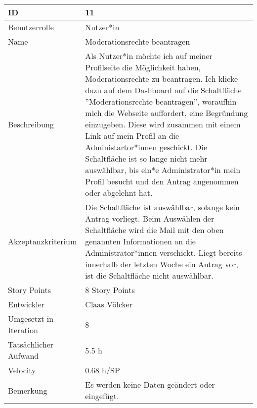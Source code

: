 \begin{tabularx}{\textwidth}{|p{}|X|}
	\hline
	ID & 11\\
	\hline
	Benutzerrolle & Nutzer*in\\
	\hline
	Name & Moderationsrechte beantragen\\
	\hline
	Beschreibung & Als Nutzer*in möchte ich auf meiner Profilseite die Möglichkeit haben, Moderationsrechte zu beantragen. Ich klicke dazu auf dem Dashboard auf die Schaltfläche ''Moderationsrechte beantragen'', woraufhin mich die Webseite auffordert, eine Begründung einzugeben. Diese wird zusammen mit einem Link auf mein Profil an die Administartor*innen geschickt. Die Schaltfläche ist so lange nicht mehr auswählbar, bis ein*e Administrator*in mein Profil besucht und den Antrag angenommen oder abgelehnt hat.\\
	\hline
	Akzeptanzkriterium & Die Schaltfläche ist auswählbar, solange kein Antrag vorliegt. Beim Auswählen der Schaltfläche wird die Mail mit den oben genannten Informationen an die Administrator*innen verschickt. Liegt bereits innerhalb der letzten Woche ein Antrag vor, ist die Schaltfläche nicht auswählbar.\\
	\hline
	Story Points & 8 Story Points\\
	\hline
	Entwickler & Claas Völcker\\
	\hline
	Umgesetzt in Iteration & 8\\
	\hline
	Tatsächlicher Aufwand & 5.5 h\\
	\hline
	Velocity & 0.68 h/SP\\
	\hline
	Bemerkung & Es werden keine Daten geändert oder eingefügt.\\
	\hline
\end{tabularx}
\vspace{20pt}
